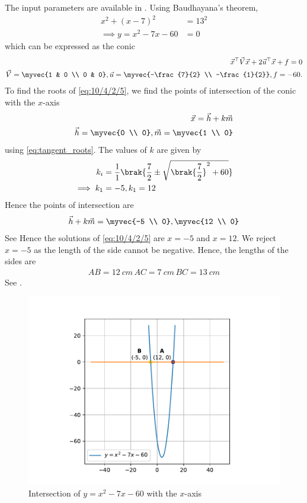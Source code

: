 \begin{table}[h!]    
	\centering
	
	\caption{}
	\label{tab:10/4/2/5}
\end{table}
	The input parameters are available in .
Using Baudhayana's theorem,
\begin{align}
	\label{eq:10/4/2/5}
	x^2 + (x - 7)^2 &= 13^2 \\
	\implies    y = x^2 - 7x - 60 &= 0 
\end{align}
which 
 can be expressed as the conic
\begin{align}
    \vec{x}^\top\vec{V}\vec{x} + 2\vec{u}^\top\vec{x} + f = 0 \\
    \vec{V} = \myvec{1 & 0 \\ 0 & 0}, \vec{u} = \myvec{-\frac{7}{2} \\ -\frac{1}{2}}, f = -60.
\end{align}
To find the roots of 
	\eqref{eq:10/4/2/5},
we find the points of intersection of the 
conic 
with the $x$-axis 
\begin{align}
    \vec{x} = \vec{h} + k\vec{m} \\
    \vec{h} = \myvec{0 \\ 0}, \vec{m} = \myvec{1 \\ 0}
\end{align}
using
\eqref{eq:tangent_roots}. 
The values of $k$ are given by
\begin{align}
k_i    &= \frac{1}{1} \brak{\frac{7}{2} \pm \sqrt{\brak{\frac{7}{2}}^2 + 60}} \\
  \implies  k_1 &= -5, k_1 = 12
\end{align}
Hence the points of intersection are
\begin{align}
    \vec{h} + k\vec{m} = \myvec{-5 \\ 0}, \myvec{12 \\ 0}
\end{align}
See 
Hence the solutions of 
	\eqref{eq:10/4/2/5}
are $x = -5$ and $x = 12$. We reject $x = -5$ as the length of the side
cannot be negative. Hence, the lengths of the sides are
\begin{align}
    AB = 12\ cm \,
    AC = 7\ cm \,
    BC = 13\ cm
\end{align}
See	.
\begin{figure}[H]
    \centering
    \includegraphics[width=0.75\columnwidth]{chapters/10/4/2/5/figs/parabola.pdf}
    \caption{Intersection of $y = x^2 - 7x - 60$ with the $x$-axis}
	\label{fig:quad1}
\end{figure}
